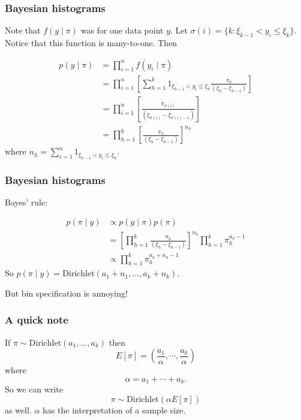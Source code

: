 \documentclass{beamer}
\begin{document}
\begin{frame}
\frametitle{Bayesian histograms}

Note that $f(y \mid \pi)$ was for one data point $y$. Let $\sigma(i) = \{k : \xi_{k-1} < y_i \le \xi_{k} \}$. Notice that this function is many-to-one. Then

\begin{align*}
p(y \mid \pi)  &= \prod_{i=1}^n f(y_i \mid \pi) \\
&= \prod_{i=1}^n\left[ \sum_{h=1}^k 1_{\xi_{h-1} < y_i \le \xi_{h} } \frac{\pi_h}{(\xi_{h} - \xi_{h-1})} \right] \\
&= \prod_{i=1}^n\left[  \frac{\pi_{\sigma(i)} }{(\xi_{\sigma(i)} - \xi_{\sigma(i)-1}  )} \right] \\
&= \prod_{h=1}^k \left[  \frac{\pi_{h} }{(\xi_{h} - \xi_{h-1}  )} \right] ^{n_h}
\end{align*}  
where $n_h = \sum_{i=1}^n 1_{\xi_{h-1} < y_i \le \xi_{h} }$.
\end{frame}

\begin{frame}
\frametitle{Bayesian histograms}

Bayes' rule:

\begin{align*}
p(\pi \mid y) &\propto p(y \mid \pi) p(\pi) \\
&= \left[\prod_{h=1}^k   \frac{\pi_{h} }{(\xi_{h} - \xi_{h-1}  )} \right] ^{n_h}\prod_{h=1}^k \pi_h^{a_h-1} \\
&\propto \prod_{h=1}^k \pi_h^{a_h+n_h-1}
\end{align*}
So $p(\pi \mid y) = \text{Dirichlet}(a_1 + n_1, \ldots, a_k + n_k)$.
\pause
\newline

But bin specification is annoying!
\end{frame}

\begin{frame}
\frametitle{A quick note}

If $\pi \sim \text{Dirichlet}(a_1, \ldots, a_k)$ then
$$
E[\pi] = \left(\frac{a_1}{\alpha}, \cdots, \frac{a_k}{\alpha} \right)
$$
where 
$$
\alpha = a_1 + \cdots + a_k.
$$
So we can write 
$$
\pi \sim \text{Dirichlet}(\alpha E[\pi])
$$
as well. $\alpha$ has the interpretation of a sample size.

\end{frame}
\end{document}
